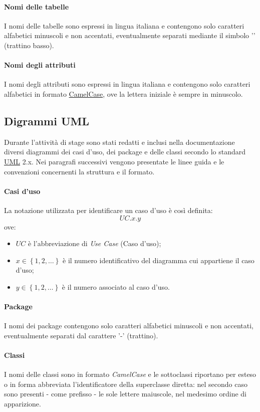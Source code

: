 \documentclass[11pt,a4paper,headsepline,hidelinks]{scrreprt} %
\begin{document}
	\paragraph{Nomi delle tabelle}
	I nomi delle tabelle sono espressi in lingua italiana e contengono solo caratteri alfabetici minuscoli e non accentati, eventualmente separati mediante il simbolo '\textunderscore' (trattino basso).
	
	\paragraph{Nomi degli attributi}
	I nomi degli attributi sono espressi in lingua italiana e contengono solo caratteri alfabetici in formato \underline{CamelCase}, ove la lettera iniziale è sempre in minuscolo.
	
	\subsection{Digrammi UML}
	Durante l'attività di stage sono stati redatti e inclusi nella documentazione diversi diagrammi dei casi d'uso, dei package e delle classi secondo lo standard \underline{UML} 2.x. Nei paragrafi successivi vengono presentate le linee guida e le convenzioni concernenti la struttura e il formato.
	
	\paragraph{Casi d'uso} La notazione utilizzata per identificare un caso d'uso è così definita:
	$$UC.x.y$$
	ove:
	\begin{itemize}
		\item $UC$ è l'abbreviazione di \textit{Use Case} (Caso d'uso);
		\item $x \in \left\{1,2,\ldots\right\}$ è il numero identificativo del diagramma cui appartiene il caso d'uso;
		\item $y \in \left\{1,2,\ldots\right\}$ è il numero associato al caso d'uso.
	\end{itemize}
	
	\paragraph{Package}
	I nomi dei package contengono solo caratteri alfabetici minuscoli e non accentati, eventualmente separati dal carattere '-' (trattino).
	
	\paragraph{Classi}
	I nomi delle classi sono in formato \textit{CamelCase} e le sottoclassi riportano per esteso o in forma abbreviata l'identificatore della superclasse diretta: nel secondo caso sono presenti - come prefisso - le sole lettere maiuscole, nel medesimo ordine di apparizione.
	
\end{document}
